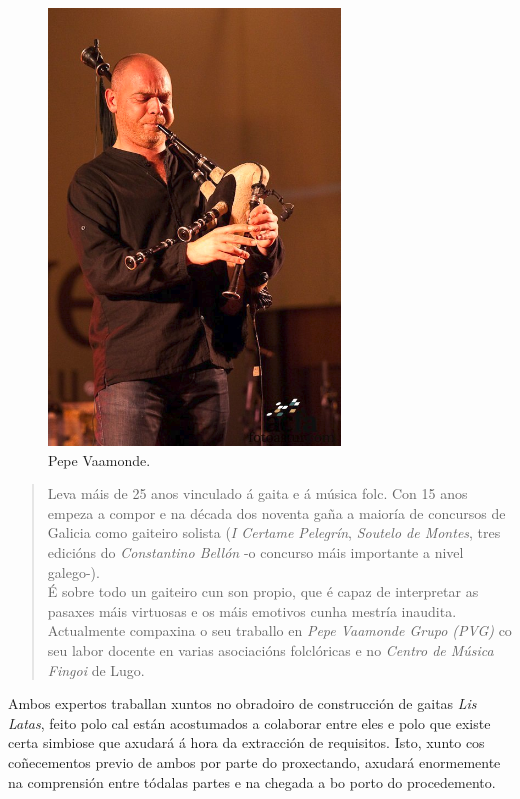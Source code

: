   \begin{figure}[htbp]
   \centering
   \includegraphics[scale=0.8,keepaspectratio=true]{./imagenes/pepe-vaamonde.png}
   \caption{Pepe Vaamonde.}
   \label{figura:PepeVaamonde}
  \end{figure}

  \begin{quotation}
  \slshape

   Leva máis de 25 anos vinculado á gaita e á música folc. Con 15 anos empeza a
   compor e na década dos noventa gaña a maioría de concursos de Galicia como
   gaiteiro solista (\textit{I Certame Pelegrín}, \textit{Soutelo de Montes},
   tres edicións do \textit{Constantino Bellón} -o concurso máis importante a
   nivel galego-). \\

   É sobre todo un gaiteiro cun son propio, que é capaz de interpretar as
   pasaxes máis virtuosas e os máis emotivos cunha mestría inaudita. \\

   Actualmente compaxina o seu traballo en \textit{Pepe Vaamonde Grupo (PVG)}
   \cite{PVG} co seu labor docente en varias asociacións folclóricas e no
   \textit{Centro de Música Fingoi} de Lugo. \\
  \end{quotation}

  Ambos expertos traballan xuntos no obradoiro de construcción de gaitas
  \textit{Lis Latas}, feito polo cal están acostumados a colaborar entre eles e
  polo que existe certa simbiose que axudará á hora da extracción de
  requisitos. Isto, xunto cos coñecementos previo de ambos por parte do
  proxectando, axudará enormemente na comprensión entre tódalas partes e na
  chegada a bo porto do procedemento. \\

